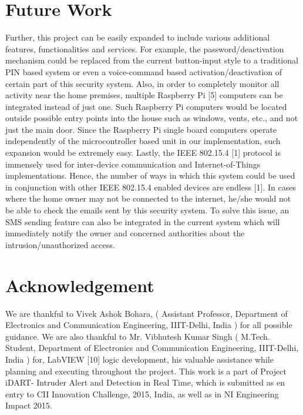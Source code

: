 \documentclass[letterpaper, 10 pt, conference]{ieeeconf}
\begin{document}
\section{Future Work}
Further, this project can be easily expanded to include various additional features, functionalities and services. For example, the password/deactivation mechanism could be replaced from the current button-input style to a traditional PIN based system or even a voice-command based activation/deactivation of certain part of this security system.
Also, in order to completely monitor all activity near the home premises, multiple Raspberry Pi [5] computers can be integrated instead of just one. Such Raspberry Pi computers would be located outside possible entry points into the house such as windows, vents, etc., and not just the main door. Since the Raspberry Pi single board computers operate independently of the microcontroller based unit in our implementation, such expansion would be extremely easy.
Lastly, the IEEE 802.15.4 [1] protocol is immensely used for inter-device communication and Internet-of-Things implementations. Hence, the number of ways in which this system could be used in conjunction with other IEEE 802.15.4 enabled devices are endless [1]. In cases where the home owner may not be connected to the internet, he/she would not be able to check the emails sent by this security system. To solve this issue, an SMS sending feature can also be integrated in the current system which will immediately notify the owner and concerned authorities about the intrusion/unauthorized access.

\section{Acknowledgement}
We are thankful to Vivek Ashok Bohara, ( Assistant Professor, Department of Electronics and Communication Engineering, IIIT-Delhi, India ) for all possible guidance. We are also thankful to Mr. Vibhutesh Kumar Singh ( M.Tech. Student, Department of Electronics and Communication Engineering, IIIT-Delhi, India ) for, LabVIEW [10] logic development, his valuable assistance while planning and executing throughout the project. This work is a part of Project iDART- Intruder Alert and Detection in Real Time, which is submitted as en entry to CII Innovation Challenge, 2015, India, as well as in NI Engineering Impact 2015.




\addtolength{\textheight}{-12cm}   
\end{document}
